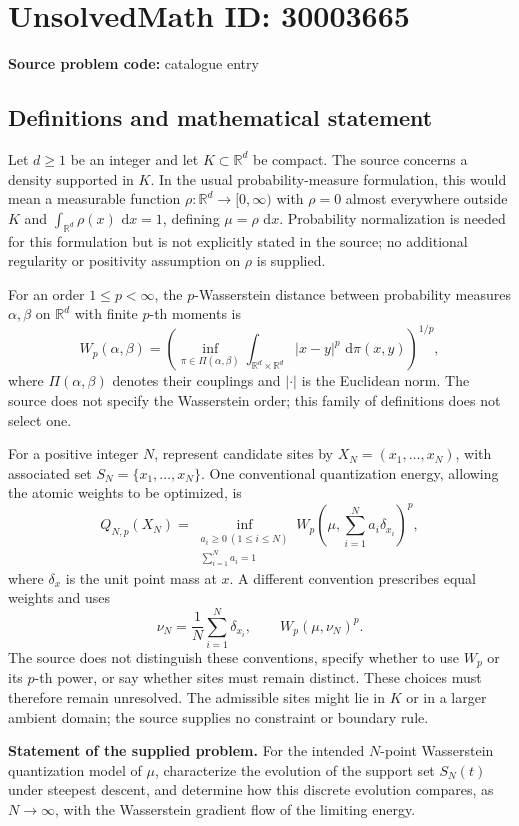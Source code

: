 \documentclass[11pt]{article}
\newcommand{\R}{\mathbb{R}}
\newcommand{\dd}{\,\mathrm{d}}
\begin{document}
\section*{UnsolvedMath ID: 30003665}
\textbf{Source problem code:} catalogue entry
\subsection{Definitions and mathematical statement}
Let \(d\geq 1\) be an integer and let \(K\subset\R^d\) be compact. The source concerns a density supported in \(K\). In the usual probability-measure formulation, this would mean a measurable function \(\rho:\R^d\to[0,\infty)\) with \(\rho=0\) almost everywhere outside \(K\) and \(\int_{\R^d}\rho(x)\,\dd x=1\), defining \(\mu=\rho\,\dd x\). Probability normalization is needed for this formulation but is not explicitly stated in the source; no additional regularity or positivity assumption on \(\rho\) is supplied.

For an order \(1\leq p<\infty\), the \(p\)-Wasserstein distance between probability measures \(\alpha,\beta\) on \(\R^d\) with finite \(p\)-th moments is
\[
W_p(\alpha,\beta)=\left(\inf_{\pi\in\Pi(\alpha,\beta)}\int_{\R^d\times\R^d}|x-y|^p\,\dd\pi(x,y)\right)^{1/p},
\]
where \(\Pi(\alpha,\beta)\) denotes their couplings and \(|\cdot|\) is the Euclidean norm. The source does not specify the Wasserstein order; this family of definitions does not select one.

For a positive integer \(N\), represent candidate sites by \(X_N=(x_1,\ldots,x_N)\), with associated set \(S_N=\{x_1,\ldots,x_N\}\). One conventional quantization energy, allowing the atomic weights to be optimized, is
\[
Q_{N,p}(X_N)=\inf_{\substack{a_i\geq0\ (1\leq i\leq N)\\\sum_{i=1}^N a_i=1}}W_p\!\left(\mu,\sum_{i=1}^N a_i\delta_{x_i}\right)^p,
\]
where \(\delta_x\) is the unit point mass at \(x\). A different convention prescribes equal weights and uses
\[
\nu_N=\frac1N\sum_{i=1}^N\delta_{x_i},\qquad W_p(\mu,\nu_N)^p.
\]
The source does not distinguish these conventions, specify whether to use \(W_p\) or its \(p\)-th power, or say whether sites must remain distinct. These choices must therefore remain unresolved. The admissible sites might lie in \(K\) or in a larger ambient domain; the source supplies no constraint or boundary rule.

\textbf{Statement of the supplied problem.} For the intended \(N\)-point Wasserstein quantization model of \(\mu\), characterize the evolution of the support set \(S_N(t)\) under steepest descent, and determine how this discrete evolution compares, as \(N\to\infty\), with the Wasserstein gradient flow of the limiting energy.
\end{document}
